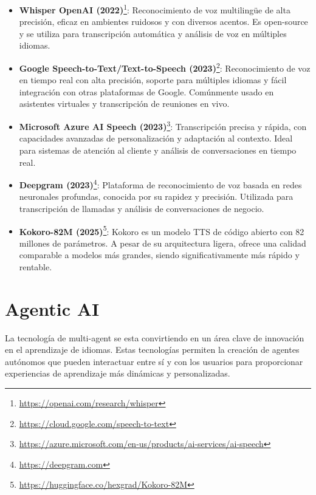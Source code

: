 \begin{itemize}
  \item \textbf{Whisper OpenAI (2022)}\footnote{\url{https://openai.com/research/whisper}}: Reconocimiento de voz multilingüe de alta precisión, eficaz en ambientes ruidosos y con diversos acentos. Es \gls{open-source} y se utiliza para transcripción automática y análisis de voz en múltiples idiomas.
  \item \textbf{Google Speech-to-Text/Text-to-Speech (2023)}\footnote{\url{https://cloud.google.com/speech-to-text}}: Reconocimiento de voz en tiempo real con alta precisión, soporte para múltiples idiomas y fácil integración con otras plataformas de Google. Comúnmente usado en asistentes virtuales y transcripción de reuniones en vivo.
  \item \textbf{Microsoft Azure AI Speech (2023)}\footnote{\url{https://azure.microsoft.com/en-us/products/ai-services/ai-speech}}: Transcripción precisa y rápida, con capacidades avanzadas de personalización y adaptación al contexto. Ideal para sistemas de atención al cliente y análisis de conversaciones en tiempo real.
  \item \textbf{Deepgram (2023)}\footnote{\url{https://deepgram.com}}: Plataforma de reconocimiento de voz basada en redes neuronales profundas, conocida por su rapidez y precisión. Utilizada para transcripción de llamadas y análisis de conversaciones de negocio.
  \item \textbf{Kokoro-82M (2025)}\footnote{\url{https://huggingface.co/hexgrad/Kokoro-82M}}: Kokoro es un modelo TTS de código abierto con 82 millones de parámetros. A pesar de su arquitectura ligera, ofrece una calidad comparable a modelos más grandes, siendo significativamente más rápido y rentable.
\end{itemize}

\section{Agentic AI}

La tecnología de \gls{multi-agent} se esta convirtiendo en un área clave de innovación en el aprendizaje de idiomas. Estas tecnologías permiten la creación de agentes autónomos que pueden interactuar entre sí y con los usuarios para proporcionar experiencias de aprendizaje más dinámicas y personalizadas.

